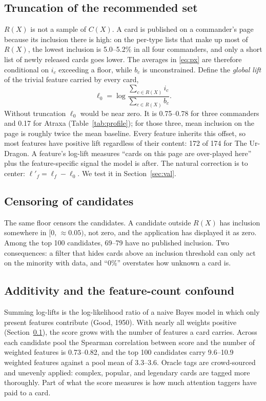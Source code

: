 \documentclass[11pt]{article}
\theoremstyle{remark}
\begin{document}
\subsection{Truncation of the recommended set}\label{sec:trunc}
\noindent $R(X)$ is not a sample of $C(X)$. A card is published on a commander's
page because its inclusion there is high: on the per-type lists that make up
most of $R(X)$, the lowest inclusion is 5.0--5.2\% in all four commanders, and
only a short list of newly released cards goes lower. The averages in
\eqref{eq:px} are therefore conditional on $i_c$ exceeding a floor, while $b_c$
is unconstrained. Define the
\emph{global lift} of the trivial feature carried by every card,
\begin{equation}
  \ell_0=\log\frac{\sum_{c\in R(X)} i_c}{\sum_{c\in R(X)} b_c}.
\end{equation}
Without truncation $\ell_0$ would be near zero. It is 0.75--0.78 for three
commanders and 0.17 for Atraxa (Table~\ref{tab:profile}); for those three, mean
inclusion on the page is roughly twice the mean baseline. Every feature inherits
this offset, so most features have positive lift regardless of their content: 172
of 174 for The Ur-Dragon. A feature's log-lift measures ``cards on this page are over-played
here'' plus the feature-specific signal the model is after. The natural
correction is to center: $\ell'_f=\ell_f-\ell_0$. We test it in
Section~\ref{sec:val}.

\subsection{Censoring of candidates}
\noindent The same floor censors the candidates. A candidate outside $R(X)$ has
inclusion somewhere in $[0,\,\approx\!0.05)$, not zero, and the application has
displayed it as zero. Among the top 100 candidates, 69--79 have no published
inclusion. Two consequences: a filter that hides cards above an inclusion
threshold can only act on the minority with data, and ``0\%'' overstates how
unknown a card is.

\subsection{Additivity and the feature-count confound}\label{sec:additive}
\noindent Summing log-lifts is the log-likelihood ratio of a naive Bayes model in
which only present features contribute (Good, 1950). With nearly all weights
positive (Section~\ref{sec:trunc}), the score grows with the number of features a
card carries. Across each candidate pool the Spearman correlation between score
and the number of weighted features is 0.73--0.82, and the top 100 candidates
carry 9.6--10.9 weighted features against a pool mean of 3.3--3.6. Oracle tags are
crowd-sourced and unevenly applied: complex, popular, and legendary cards are
tagged more thoroughly. Part of what the score measures is how much attention
taggers have paid to a card.
\end{document}
